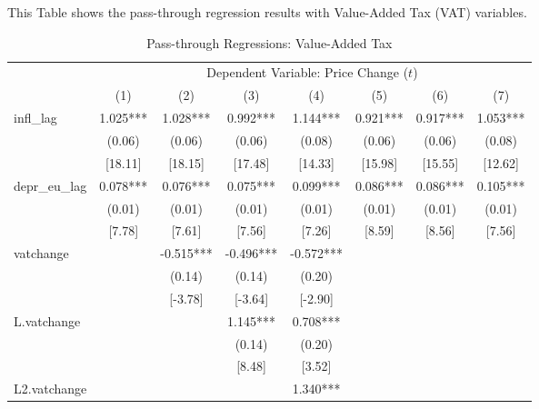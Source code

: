 \clearpage
\begin{table}
	\caption{Pass-through Regressions: Value-Added Tax}\label{tbl:vat}
	{\small This Table shows the pass-through regression results with Value-Added Tax (VAT) variables.
		
		\begin{tabular}{lccccccc}
			\hline\hline
			                   &           \multicolumn{7}{c}{Dependent Variable: Price Change ($ t $)}            \\
			                   &    (1)    &    (2)    &    (3)    &    (4)    &    (5)    &    (6)    &    (7)    \\ \hline\hline
			infl\_lag          & 1.025***  & 1.028***  & 0.992***  & 1.144***  & 0.921***  & 0.917***  & 1.053***  \\
			                   &  (0.06)   &  (0.06)   &  (0.06)   &  (0.08)   &  (0.06)   &  (0.06)   &  (0.08)   \\
			                   &  [18.11]  &  [18.15]  &  [17.48]  &  [14.33]  &  [15.98]  &  [15.55]  &  [12.62]  \\
			depr\_eu\_lag      & 0.078***  & 0.076***  & 0.075***  & 0.099***  & 0.086***  & 0.086***  & 0.105***  \\
			                   &  (0.01)   &  (0.01)   &  (0.01)   &  (0.01)   &  (0.01)   &  (0.01)   &  (0.01)   \\
			                   &  [7.78]   &  [7.61]   &  [7.56]   &  [7.26]   &  [8.59]   &  [8.56]   &  [7.56]   \\\hline
			vatchange          &           & -0.515*** & -0.496*** & -0.572*** &           &           &           \\
			                   &           &  (0.14)   &  (0.14)   &  (0.20)   &           &           &           \\
			                   &           &  [-3.78]  &  [-3.64]  &  [-2.90]  &           &           &           \\
			L.vatchange        &           &           & 1.145***  & 0.708***  &           &           &           \\
			                   &           &           &  (0.14)   &  (0.20)   &           &           &           \\
			                   &           &           &  [8.48]   &  [3.52]   &           &           &           \\
			L2.vatchange       &           &           &           & 1.340***  &           &           &           \\

\end{tabular}}
\end{table}
